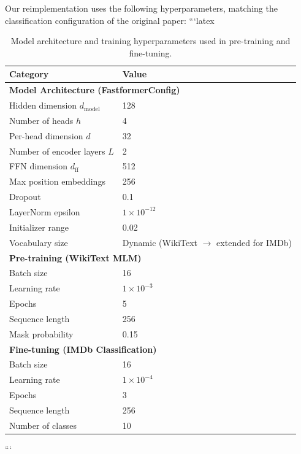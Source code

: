 \documentclass[11pt,a4paper]{article}
\theoremstyle{definition}
\begin{document}
Our reimplementation uses the following hyperparameters, matching the classification
configuration of the original paper:
```latex
\begin{table}[H]
\centering
\caption{Model architecture and training hyperparameters used in pre-training and fine-tuning.}
\label{tab:hyperparams}
\begin{tabular}{ll}
\toprule
\textbf{Category} & \textbf{Value} \\
\midrule

\multicolumn{2}{l}{\textbf{Model Architecture (FastformerConfig)}} \\
\midrule
Hidden dimension $d_{\text{model}}$ & 128 \\
Number of heads $h$                 & 4 \\
Per-head dimension $d$              & 32 \\
Number of encoder layers $L$        & 2 \\
FFN dimension $d_{\text{ff}}$       & 512 \\
Max position embeddings             & 256 \\
Dropout                             & 0.1 \\
LayerNorm epsilon                   & $1 \times 10^{-12}$ \\
Initializer range                   & 0.02 \\
Vocabulary size                     & Dynamic (WikiText $\rightarrow$ extended for IMDb) \\

\midrule
\multicolumn{2}{l}{\textbf{Pre-training (WikiText MLM)}} \\
\midrule
Batch size                          & 16 \\
Learning rate                       & $1 \times 10^{-3}$ \\
Epochs                              & 5 \\
Sequence length                     & 256 \\
Mask probability                    & 0.15 \\

\midrule
\multicolumn{2}{l}{\textbf{Fine-tuning (IMDb Classification)}} \\
\midrule
Batch size                          & 16 \\
Learning rate                       & $1 \times 10^{-4}$ \\
Epochs                              & 3 \\
Sequence length                     & 256 \\
Number of classes                   & 10 \\

\bottomrule
\end{tabular}
\end{table}
```
\end{document}
